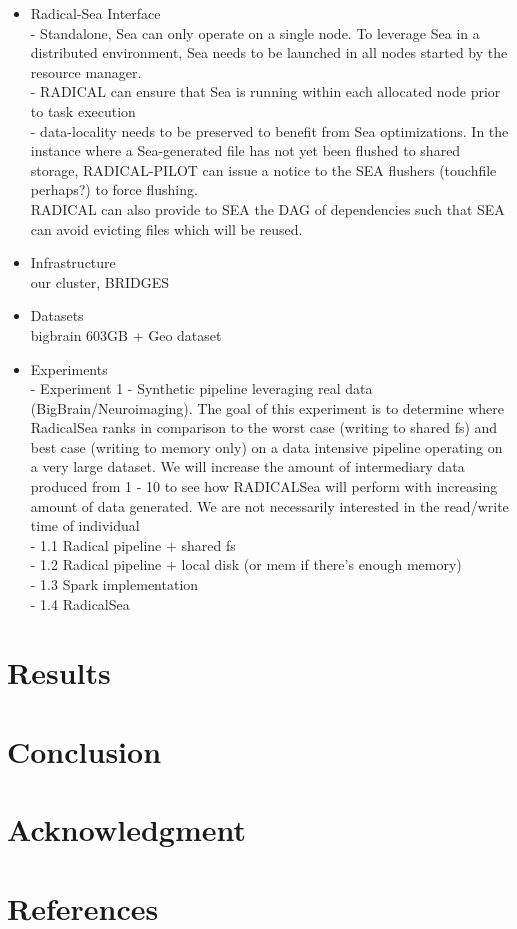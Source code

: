 \documentclass[conference]{IEEEtran}
\begin{document}
\begin{itemize}
    \item{Radical-Sea Interface}
        \\ - Standalone, Sea can only operate on a single node. To leverage Sea in a distributed environment, Sea needs to be launched in all nodes started by the
        resource manager.
        \\ - RADICAL can ensure that Sea is running within each allocated node prior to task execution
        \\ - data-locality needs to be preserved to benefit from Sea optimizations. In the instance where a Sea-generated file has not yet been flushed to shared storage, RADICAL-PILOT can issue a notice to the SEA flushers (touchfile perhaps?) to force flushing.
        \\ RADICAL can also provide to SEA the DAG of dependencies such that SEA can avoid evicting files which will be reused.
    \item{Infrastructure} \\our cluster, BRIDGES
    \item{Datasets} \\ bigbrain 603GB + Geo dataset
    \item{Experiments}
        \\ - Experiment 1 - Synthetic pipeline leveraging real data (BigBrain/Neuroimaging). The goal of this experiment is to determine
            where RadicalSea ranks in comparison to the worst case (writing to shared fs) and best case (writing to memory only) on
            a data intensive pipeline operating on a very large dataset. 
            We will increase the amount of intermediary data produced from 1 - 10 to see how RADICALSea will perform with increasing amount of data generated.
            We are not necessarily interested in the read/write time of individual
        \\      - 1.1 Radical pipeline + shared fs
        \\      - 1.2 Radical pipeline + local disk (or mem if there's enough memory)
        \\      - 1.3 Spark implementation
        \\      - 1.4 RadicalSea
        \\
\end{itemize}
\section{Results}
\section{Conclusion}

\section*{Acknowledgment}

\section*{References}
\end{document}
